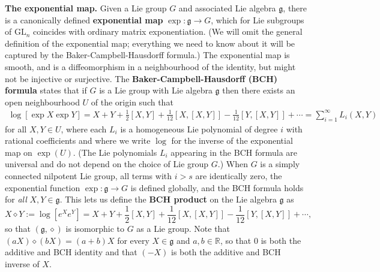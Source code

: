 \documentclass[11pt]{article}
\numberwithin{equation}{section}
\theoremstyle{plain}
\theoremstyle{definition}
\theoremstyle{remark}
\numberwithin{equation}{section}
\newcommand{\R}{\mathbb R}
\numberwithin{equation}{section}
\begin{document}
\textbf{The exponential map.} Given a Lie group $G$ and associated Lie algebra $\mathfrak{g}$, there is a canonically defined \textbf{exponential map} $\exp:\mathfrak{g}\to G$, which for Lie subgroups of $\mathrm{GL}_n$ coincides with ordinary matrix exponentiation. (We will omit the general definition of the exponential map; everything we need to know about it will be captured by the Baker-Campbell-Hausdorff formula.) The exponential map is smooth, and is a diffeomorphism in a neighbourhood of the identity, but might not be injective or surjective.
The \textbf{Baker-Campbell-Hausdorff (BCH) formula} \cite[Chapter 1.2.5]{MR3237440} states that if $G$ is a Lie group with Lie algebra $\mathfrak{g}$ then there exists an open neighbourhood $U$ of the origin such that
\begin{align*}
\log \left[\exp X \exp Y\right] = X + Y + \frac{1}{2}[X,Y]+\frac{1}{12}[X,[X,Y]]-\frac{1}{12}[Y,[X,Y]]+\cdots
= \sum_{i=1}^\infty L_i(X,Y)
\end{align*}
for all $X,Y \in U$, where each $L_i$ is a homogeneous Lie polynomial of degree $i$ with rational coefficients and where we write $\log$ for the inverse of the exponential map on $\exp(U)$. (The Lie polynomials $L_i$ appearing in the BCH formula are universal and do not depend on the choice of Lie group $G$.) When $G$ is a simply connected nilpotent Lie group, all terms with $i>s$ are identically zero, the exponential function $\exp:\mathfrak{g}\to G$ is defined globally, and the BCH formula holds for \emph{all} $X,Y \in\mathfrak{g}$.
This lets us define the \textbf{BCH product} on the Lie algebra $\mathfrak{g}$ as
\[X\diamond Y := \log \left[e^Xe^Y\right]  = X + Y + \frac{1}{2}[X,Y]+\frac{1}{12}[X,[X,Y]]-\frac{1}{12}[Y,[X,Y]]+\cdots,
\]
so that $(\mathfrak{g},\diamond)$ is isomorphic to $G$ as a Lie group. Note that $(aX) \diamond (bX)=(a+b)X$ for every $X \in \mathfrak{g}$ and $a,b\in \R$, so that $0$ is both the additive and BCH identity and that $(-X)$ is both the additive and BCH inverse of $X$.
\end{document}
